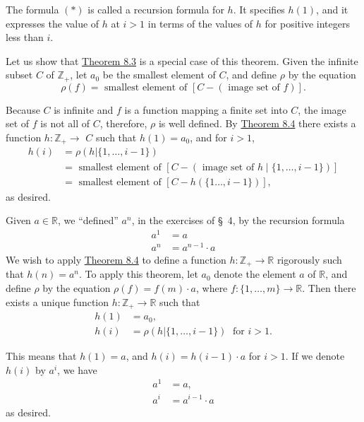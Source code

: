 The formula \((*)\) is called a recursion formula for \(h\). It specifies 
\(h(1)\), and it expresses the value of \(h\) at \(i > 1\) in terms of the values 
of \(h\) for positive integers less than \(i\).

\begin{centeredblock*}
 \begin{example}
\label{ex:\thesection.\theexample}
 Let us show that \hyperref[thm:8.3]{Theorem 8.3} is a special case of this theorem. Given the infinite subset \(C\) of \(\mathbb{Z}_{+}\), let \(a_{0}\) be the smallest element of \(C\), and define \(\rho\) by the equation
 \[
 \rho ( f) = \text{ smallest element of }[{C - ({\text{ image set of }f}) }] \text{.}
 \]

 Because \(C\) is infinite and \(f\) is a function mapping a finite set into \(C\), the image set of \(f\) is not all of \(C\), therefore, \(\rho\) is well defined. By \hyperref[thm:8.4]{Theorem 8.4} there exists a function \(h \colon {\mathbb{Z}}_{+} \rightarrow\) \(C\) such that \(h(1) = a_{0}\), and for \(i > 1\),
 \[
 \begin{aligned}
 h(i) &= \rho ({h|\{1,\ldots, i - 1\} }) \\
 &= \text{ smallest element of }[{C - ({\text{ image set of }h \mid \{1,\ldots, i - 1\} }) }] \\
 &= \text{ smallest element of }[{C - h({\{1\ldots, i - 1\} }) }] \text{, }
 \end{aligned}
 \]
 as desired.
 \end{example}
\end{centeredblock*}

\begin{centeredblock*}
 \begin{example}
\label{ex:\thesection.\theexample}
 Given \(a \in \mathbb{R}\), we ``defined'' \(a^{n}\), in the exercises of \S\ 4, by the recursion formula
 \[
 \begin{aligned}
 a^{1} &= a \\
 a^{n} &= a^{n - 1} \cdot a
 \end{aligned}
 \]
 We wish to apply \hyperref[thm:8.4]{Theorem 8.4} to define a function \(h : \mathbb{Z}_{+} \rightarrow \mathbb{R}\) rigorously such that \(h(n) = a^{n}\). To apply this theorem, let \(a_{0}\) denote the element \(a\) of \(\mathbb{R}\), and define \(\rho\) by the equation \(\rho ( f) = f( m) \cdot a\), where \(f : \{1,\ldots, m\} \rightarrow \mathbb{R}\). Then there exists a unique function \(h : \mathbb{Z}_{+} \rightarrow \mathbb{R}\) such that
 \[
 \begin{aligned}
 h(1) &= a_{0}, \\
 h(i) &= \rho ({h|\{1,\ldots, i - 1\} }) \;\text{ for }i > 1.
 \end{aligned}
 \]

 This means that \(h(1) = a\), and \(h(i) = h({i - 1}) \cdot a\) for \(i > 1\). If we denote \(h(i)\) by \(a^{i}\), we have
 \[
 \begin{aligned}
 a^{1} &= a, \\
 a^{i} &= a^{i - 1} \cdot a
 \end{aligned}
 \]
 as desired.
 \end{example}
\end{centeredblock*}

